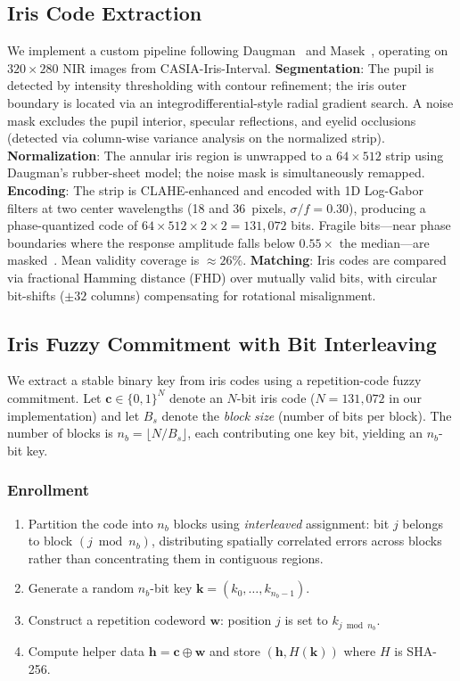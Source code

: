 \documentclass[3p,twocolumn]{elsarticle}
\begin{document}
\subsection{Iris Code Extraction}
\label{sec:iris_extraction}

We implement a custom pipeline following Daugman~\cite{daugman2004how} and Masek~\cite{masek2003thesis}, operating on $320 \times 280$ NIR images from CASIA-Iris-Interval. \textbf{Segmentation}: The pupil is detected by intensity thresholding with contour refinement; the iris outer boundary is located via an integrodifferential-style radial gradient search. A noise mask excludes the pupil interior, specular reflections, and eyelid occlusions (detected via column-wise variance analysis on the normalized strip). \textbf{Normalization}: The annular iris region is unwrapped to a $64 \times 512$ strip using Daugman's rubber-sheet model; the noise mask is simultaneously remapped. \textbf{Encoding}: The strip is CLAHE-enhanced and encoded with 1D Log-Gabor filters at two center wavelengths (18 and 36~pixels, $\sigma/f = 0.30$), producing a phase-quantized code of $64 \times 512 \times 2 \times 2 = 131{,}072$ bits. Fragile bits---near phase boundaries where the response amplitude falls below $0.55\times$ the median---are masked~\cite{hollingsworth2009fragile}. Mean validity coverage is $\approx 26\%$. \textbf{Matching}: Iris codes are compared via fractional Hamming distance (FHD) over mutually valid bits, with circular bit-shifts ($\pm 32$ columns) compensating for rotational misalignment.

\subsection{Iris Fuzzy Commitment with Bit Interleaving}
\label{sec:iris_commitment}

We extract a stable binary key from iris codes using a repetition-code fuzzy commitment. Let $\mathbf{c} \in \{0,1\}^{N}$ denote an $N$-bit iris code ($N = 131{,}072$ in our implementation) and let $B_s$ denote the \emph{block size} (number of bits per block). The number of blocks is $n_b = \lfloor N / B_s \rfloor$, each contributing one key bit, yielding an $n_b$-bit key.

\subsubsection{Enrollment}
\begin{enumerate}
    \item Partition the code into $n_b$ blocks using \emph{interleaved} assignment: bit $j$ belongs to block $(j \bmod n_b)$, distributing spatially correlated errors across blocks rather than concentrating them in contiguous regions.
    \item Generate a random $n_b$-bit key $\mathbf{k} = (k_0, \ldots, k_{n_b-1})$.
    \item Construct a repetition codeword $\mathbf{w}$: position $j$ is set to $k_{j \bmod n_b}$.
    \item Compute helper data $\mathbf{h} = \mathbf{c} \oplus \mathbf{w}$ and store $(\mathbf{h}, H(\mathbf{k}))$ where $H$ is SHA-256.
\end{enumerate}
\end{document}
